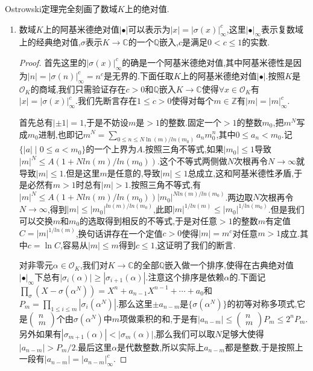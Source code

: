Ostrowski定理完全刻画了数域$K$上的绝对值.
\begin{enumerate}
	\item 数域$K$上的阿基米德绝对值$|\bullet|$可以表示为$|x|=|\sigma(x)|^c_{\infty}$,这里$|\bullet|_{\infty}$表示复数域上的经典绝对值,$\sigma$表示$K\to\mathbb{C}$的一个$\mathbb{Q}$嵌入,$c$是满足$0<c\le1$的实数.
	\begin{proof}
		
		首先这里的$|\sigma(x)|^c_{\infty}$的确是一个阿基米德绝对值,其中阿基米德性是因为$|n|=|\sigma(n)|^c_{\infty}=n^c$是无界的.下面任取$K$上的阿基米德绝对值$|\bullet|$.按照$K$是$\mathscr{O}_K$的商域,我们只需验证存在$c>0$和$\mathbb{Q}$嵌入$K\to\mathbb{C}$使得$\forall x\in\mathscr{O}_K$有$|x|=|\sigma(x)|_{\infty}^c$.我们先断言存在$1\le c>0$使得对每个$m\in\mathbb{Z}$有$|m|=|m|_{\infty}^c$.
		
		\qquad
		
		首先总有$|\pm1|=1$,于是不妨设$m$是$>1$的整数.固定一个$>1$的整数$m_0$,把$m^N$写成$m_0$进制,也即记$m^N=\sum_{0\le n\le N\ln(m)/ln(m_0)}a_nm_0^n$,其中$0\le a_n<m_0$.记$\{|a|\mid0\le a<m_0\}$的一个上界为$A$.按照三角不等式,如果$|m_0|\le1$导致$|m|^N\le A(1+Nln(m)/ln(m_0))$.这个不等式两侧做$N$次根再令$N\to\infty$就导致$|m|\le1$.但是这里$m$是任意的,导致$|m|\le1$总成立,这和阿基米德性矛盾,于是必然有$m>1$时总有$|m|>1$.按照三角不等式,有$|m|^N\le A(1+Nln(m)/ln(m_0))|m_0|^{Nln(m)/ln(m_0)}$.两边取$N$次根再令$N\to\infty$,得到$|m|\le|m_0|^{ln(m)/ln(m_0)}$,此即$|m|^{1/ln(m)}\le|m_0|^{1/ln(m_0)}$.但是我们可以交换$m$和$m_0$的选取得到相反的不等式,于是对任意$>1$的整数$m$有定值$C=|m|^{1/ln(m)}$,换句话讲存在一个定值$c>0$使得$|m|=m^c$对任意$m>1$成立.其中$c=\ln C$,容易从$|m|\le m$得到$c\le1$,这证明了我们的断言.
		
		\qquad
		
		对非零元$\alpha\in\mathscr{O}_K$,我们对$K\to\mathbb{C}$的全部$\mathbb{Q}$嵌入做一个排序,使得在古典绝对值$|\bullet|_{\infty}$下总有$|\sigma_i(\alpha)|\ge|\sigma_{i+1}(\alpha)|$.注意这个排序是依赖$\alpha$的.下面记$\prod_{\sigma}(X-\sigma(\alpha^N))=X^n+a_{n-1}X^{n-1}+\cdots+a_0$和$P_m=\prod_{1\le i\le m}|\sigma_i(\alpha^N)|$.那么这里$\pm a_{n-m}$是$\{\sigma(\alpha^N)\}$的初等对称多项式,它是$\left(\begin{array}{c}n\\m\end{array}\right)$个由$\sigma(\alpha^N)$中$m$项做乘积的和,于是有$|a_{n-m}|\le\left(\begin{array}{c}n\\m\end{array}\right)P_m\le 2^nP_m$.另外如果有$|\sigma_{m+1}(\alpha)|<|\sigma_m(\alpha)|$,那么我们可以取$N$足够大使得$|a_{n-m}|>P_m/2$.最后这里$\alpha$是代数整数,所以实际上$a_{n-m}$都是整数,于是按照上一段有$|a_{n-m}|=|a_{n-m}|_{\infty}^c$.
		

\end{proof}
\end{enumerate}
